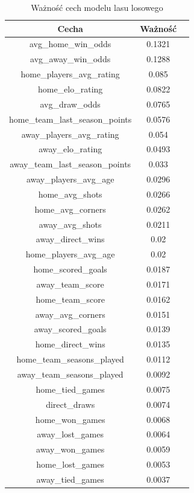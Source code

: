 \begin{table}[H]
        \caption{Ważność cech modelu lasu losowego}
        \centering
        \begin{tabular}{c c c}
        \toprule
            Cecha & Ważność \\
        \midrule
            avg\_home\_win\_odds & 0.1321 \\
            avg\_away\_win\_odds & 0.1288 \\
            home\_players\_avg\_rating & 0.085 \\
            home\_elo\_rating & 0.0822 \\
            avg\_draw\_odds & 0.0765 \\
            home\_team\_last\_season\_points & 0.0576 \\
            away\_players\_avg\_rating & 0.054 \\
            away\_elo\_rating & 0.0493 \\
            away\_team\_last\_season\_points & 0.033 \\
            away\_players\_avg\_age & 0.0296 \\
            home\_avg\_shots & 0.0266 \\
            home\_avg\_corners & 0.0262 \\
            away\_avg\_shots & 0.0211 \\
            away\_direct\_wins & 0.02 \\
            home\_players\_avg\_age & 0.02 \\
            home\_scored\_goals & 0.0187 \\
            away\_team\_score & 0.0171 \\
            home\_team\_score & 0.0162 \\
            away\_avg\_corners & 0.0151 \\
            away\_scored\_goals & 0.0139 \\
            home\_direct\_wins & 0.0135 \\
            home\_team\_seasons\_played & 0.0112 \\
            away\_team\_seasons\_played & 0.0092 \\
            home\_tied\_games & 0.0075 \\
            direct\_draws & 0.0074 \\
            home\_won\_games & 0.0068 \\
            away\_lost\_games & 0.0064 \\
            away\_won\_games & 0.0059 \\
            home\_lost\_games & 0.0053 \\
            away\_tied\_games & 0.0037 \\
        \bottomrule
        \end{tabular}
\end{table}

